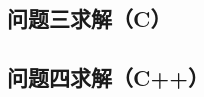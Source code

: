 \documentclass[withoutpreface,bwprint]{cumcmthesis}
\begin{document}
\begin{appendices}
\subsection{问题三求解（C）}
%

\subsection{问题四求解（C++）}
%

%

\end{appendices}
\end{document}
